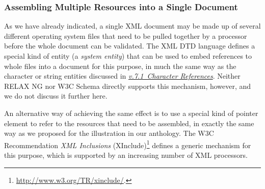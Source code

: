 \subsubsection[{Assembling Multiple Resources into a Single Document}]{Assembling Multiple Resources into a Single Document}\label{SG-mult}\par
As we have already indicated, a single XML document may be made up of several different operating system files that need to be pulled together by a processor before the whole document can be validated. The XML DTD language defines a special kind of entity (a \textit{system entity}) that can be used to embed references to whole files into a document for this purpose, in much the same way as the character or string entities discussed in \textit{\hyperref[SG-er]{v.7.1\ Character References}}. Neither RELAX NG nor W3C Schema directly supports this mechanism, however, and we do not discuss it further here.\par
An alternative way of achieving the same effect is to use a special kind of pointer element to refer to the resources that need to be assembled, in exactly the same way as we proposed for the illustration in our anthology. The W3C Recommendation \textit{XML Inclusions } (XInclude)\footnote{\url{http://www.w3.org/TR/xinclude/}.} defines a generic mechanism for this purpose, which is supported by an increasing number of XML processors.
